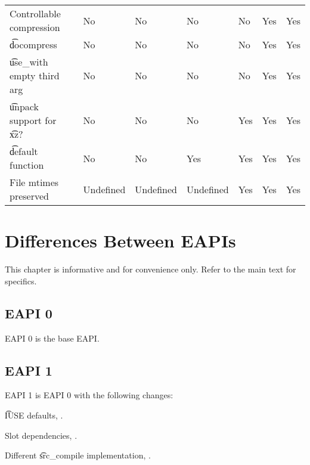 \begin{landscape}
\begin{longtable}{llP{5em}P{5em}P{6em}P{6em}P{6em}P{6em}}
Controllable compression &  &
    No & No & No & No & Yes & Yes \\

\t{docompress} &  &
    No & No & No & No & Yes & Yes \\

\t{use\_with} empty third arg &  &
    No & No & No & No & Yes & Yes \\

\t{unpack} support for \t{xz}? &  &
    No & No & No & Yes & Yes & Yes \\

\t{default} function &  &
    No & No & Yes & Yes & Yes & Yes \\

File mtimes preserved &  &
    Undefined & Undefined & Undefined & Yes & Yes & Yes \\

\end{longtable}
\end{landscape}

\chapter{Differences Between EAPIs}

\note This chapter is informative and for convenience only. Refer to the main text for specifics.

\section*{EAPI 0}

EAPI 0 is the base EAPI.

\section*{EAPI 1}

EAPI 1 is EAPI 0 with the following changes:

\begin{compactitem}
\item \t{IUSE} defaults, .
\item Slot dependencies, .
\item Different \t{src\_compile} implementation, .
\end{compactitem}

